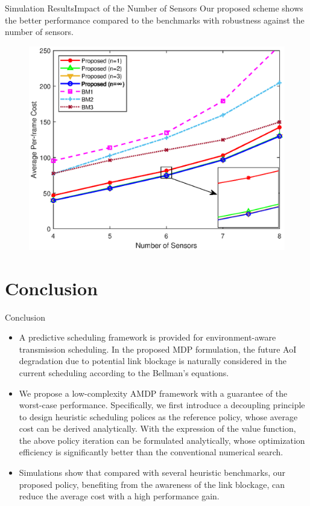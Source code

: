 \documentclass[aspectratio=169]{beamer}
\begin{document}
\begin{frame}{Simulation Results}{Impact of the Number of Sensors}
    Our proposed scheme shows the better performance compared to the benchmarks with robustness against the number of sensors.
    \begin{figure}[htb]
        \centering
        \includegraphics[width=0.4\linewidth]{fig/SenAnaK.eps}
    \end{figure}
\end{frame}

\section{Conclusion}
\begin{frame}{Conclusion}{}
    \begin{itemize}
        \item
              A predictive scheduling framework is provided for environment-aware transmission scheduling.
              In the proposed MDP formulation, the future AoI degradation due to potential link blockage is naturally considered in the current scheduling according to the Bellman's equations.
        \item
              We propose a low-complexity AMDP framework with a guarantee of the worst-case performance.
              Specifically, we first introduce a decoupling principle to design heuristic scheduling polices as the reference policy, whose average cost can be derived analytically.
              With the expression of the value function, the above policy iteration can be formulated analytically, whose optimization efficiency is significantly better than the conventional numerical search.
        \item
              Simulations show that compared with several heuristic benchmarks, our proposed policy, benefiting from the awareness of the link blockage, can reduce the average cost with a high performance gain.
    \end{itemize}
\end{frame}
\end{document}
